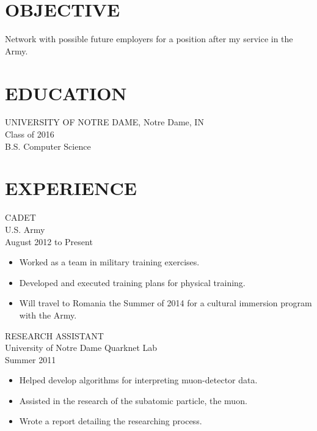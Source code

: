 \documentclass[11pt]{res} %
\begin{document}
 
 

\address{{\bf PRESENT ADDRESS} \\   420 Stanford Hall \\   Notre Dame, IN,
         46556   \\ (219) 575-1902}
\address{{\bf PERMANENT ADDRESS} \\ 4968 N Hunters Glen \\ La Porte, IN,
         46350 \\ (219) 575-1902}
                             
\begin{resume}
                                               
 
\section{OBJECTIVE}
   Network with possible future employers for a position after my service in the Army. 
 
\section{EDUCATION} 
 \noindent UNIVERSITY OF NOTRE DAME, Notre Dame, IN \\
Class of 2016\\
B.S. Computer Science \\ 
 
\section{EXPERIENCE} 
 CADET\\
U.S. Army \\
August 2012 to Present
\vspace{0.2in}
   \begin{itemize} \itemsep -2pt  %
   \item Worked as a team in military training exercises.  
   \item Developed and executed training plans for physical training.
   \item Will travel to Romania the Summer of 2014 for a cultural immersion program with the Army.  
 \end{itemize}

 RESEARCH ASSISTANT \\
University of Notre Dame Quarknet Lab \\ 
Summer 2011
\vspace{0.2in}
 \begin{itemize} \itemsep -2pt
   \item Helped develop algorithms for interpreting muon-detector data.
  \item Assisted in the research of the subatomic particle, the muon.  
  \item Wrote a report detailing the researching process.
\end{itemize} 


\end{resume}
\end{document}

